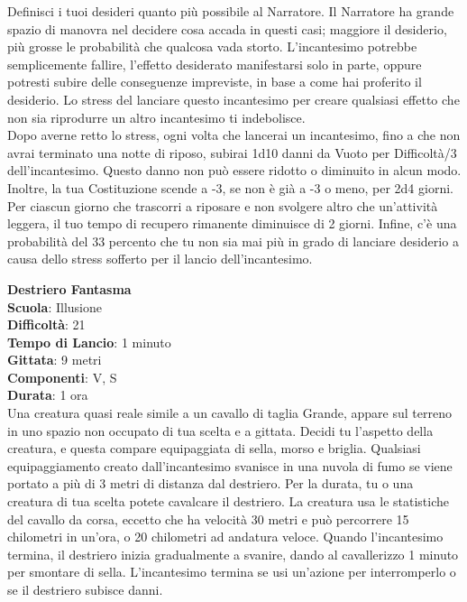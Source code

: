 \begin{multicols}{2}
\medskip
Definisci i tuoi desideri quanto più possibile al Narratore. Il Narratore ha grande spazio di
manovra nel decidere cosa accada in questi casi; maggiore il desiderio, più grosse le probabilità che qualcosa vada storto. L'incantesimo potrebbe semplicemente fallire, l'effetto desiderato manifestarsi solo in parte, oppure potresti subire delle conseguenze impreviste, in base a come hai proferito il desiderio. Lo stress del lanciare questo incantesimo per creare qualsiasi effetto che non sia riprodurre un altro incantesimo ti indebolisce.\\
Dopo averne retto lo stress, ogni volta che lancerai un incantesimo, fino a che non avrai terminato una notte di riposo, subirai 1d10 danni da Vuoto per Difficoltà/3 dell'incantesimo. Questo danno non può essere ridotto o diminuito in alcun modo. Inoltre, la tua Costituzione scende a -3, se non è già a -3 o meno, per 2d4 giorni.\\
Per ciascun giorno che trascorri a riposare e non svolgere altro che un'attività leggera, il tuo tempo di recupero rimanente diminuisce di 2 giorni. Infine, c'è una probabilità del 33 percento che tu non sia mai più in grado di lanciare desiderio a causa dello stress sofferto per il lancio dell'incantesimo.

\medskip\textbf{Destriero Fantasma}\\
\textbf{Scuola}: Illusione\\
\textbf{Difficoltà}: 21\\
\textbf{Tempo di Lancio}: 1 minuto\\
\textbf{Gittata}: 9 metri\\
\textbf{Componenti}: V, S\\
\textbf{Durata}: 1 ora\\
Una creatura quasi reale simile a un cavallo di taglia Grande, appare sul terreno in uno spazio non occupato di tua scelta e a gittata. Decidi tu l'aspetto della creatura, e questa compare equipaggiata di sella, morso e briglia. Qualsiasi equipaggiamento creato dall'incantesimo svanisce in una nuvola di fumo se viene portato a più di 3 metri di distanza dal destriero. Per la durata, tu o una creatura di tua scelta potete cavalcare il destriero. La creatura usa le statistiche del cavallo da corsa, eccetto che ha velocità 30 metri e può percorrere 15 chilometri in un'ora, o 20 chilometri ad andatura veloce. Quando l'incantesimo termina, il destriero inizia gradualmente a svanire, dando al cavallerizzo 1 minuto per smontare di sella. L'incantesimo termina se usi un'azione per interromperlo o se il destriero subisce danni.


\end{multicols}
